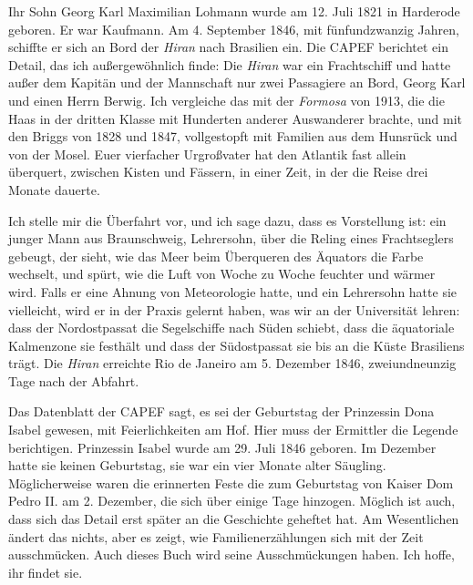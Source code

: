 \documentclass[
  ngerman,
  11pt,
  openany]{book}
\begin{document}
Ihr Sohn Georg Karl Maximilian Lohmann wurde am 12. Juli 1821 in
Harderode geboren. Er war Kaufmann. Am 4. September 1846, mit
fünfundzwanzig Jahren, schiffte er sich an Bord der \emph{Hiran} nach
Brasilien ein. Die CAPEF berichtet ein Detail, das ich außergewöhnlich
finde: Die \emph{Hiran} war ein Frachtschiff und hatte außer dem Kapitän
und der Mannschaft nur zwei Passagiere an Bord, Georg Karl und einen
Herrn Berwig. Ich vergleiche das mit der \emph{Formosa} von 1913, die
die Haas in der dritten Klasse mit Hunderten anderer Auswanderer
brachte, und mit den Briggs von 1828 und 1847, vollgestopft mit Familien
aus dem Hunsrück und von der Mosel. Euer vierfacher Urgroßvater hat den
Atlantik fast allein überquert, zwischen Kisten und Fässern, in einer
Zeit, in der die Reise drei Monate dauerte.

Ich stelle mir die Überfahrt vor, und ich sage dazu, dass es Vorstellung
ist: ein junger Mann aus Braunschweig, Lehrersohn, über die Reling eines
Frachtseglers gebeugt, der sieht, wie das Meer beim Überqueren des
Äquators die Farbe wechselt, und spürt, wie die Luft von Woche zu Woche
feuchter und wärmer wird. Falls er eine Ahnung von Meteorologie hatte,
und ein Lehrersohn hatte sie vielleicht, wird er in der Praxis gelernt
haben, was wir an der Universität lehren: dass der Nordostpassat die
Segelschiffe nach Süden schiebt, dass die äquatoriale Kalmenzone sie
festhält und dass der Südostpassat sie bis an die Küste Brasiliens
trägt. Die \emph{Hiran} erreichte Rio de Janeiro am 5. Dezember 1846,
zweiundneunzig Tage nach der Abfahrt.

Das Datenblatt der CAPEF sagt, es sei der Geburtstag der Prinzessin Dona
Isabel gewesen, mit Feierlichkeiten am Hof. Hier muss der Ermittler die
Legende berichtigen. Prinzessin Isabel wurde am 29. Juli 1846 geboren.
Im Dezember hatte sie keinen Geburtstag, sie war ein vier Monate alter
Säugling. Möglicherweise waren die erinnerten Feste die zum Geburtstag
von Kaiser Dom Pedro II. am 2. Dezember, die sich über einige Tage
hinzogen. Möglich ist auch, dass sich das Detail erst später an die
Geschichte geheftet hat. Am Wesentlichen ändert das nichts, aber es
zeigt, wie Familienerzählungen sich mit der Zeit ausschmücken. Auch
dieses Buch wird seine Ausschmückungen haben. Ich hoffe, ihr findet sie.
\end{document}
